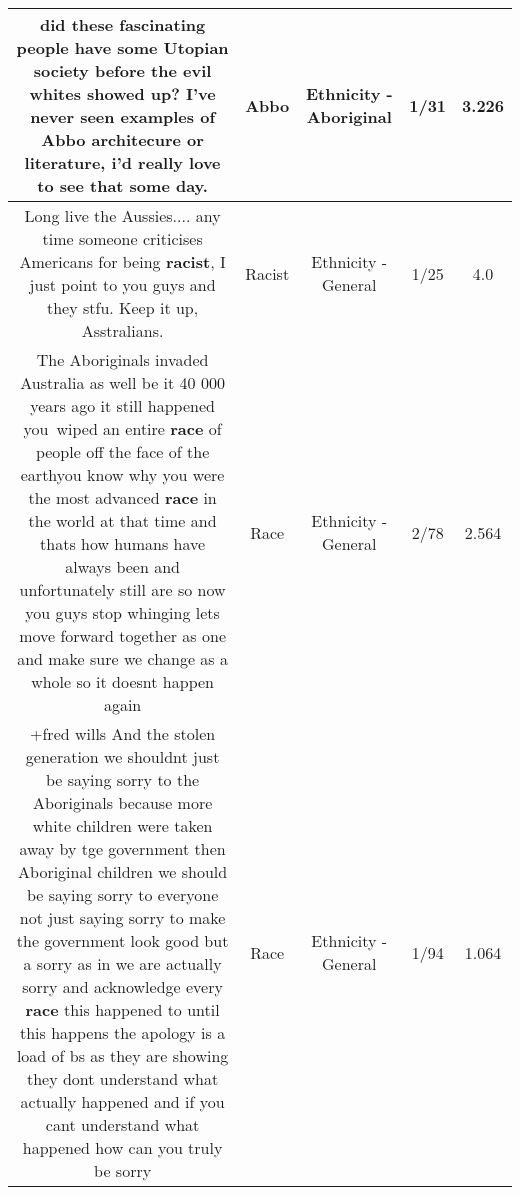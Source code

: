 \documentclass[11pt]{article}
\newlength\mylength
\begin{document}
\begin{center}
\begin{longtable}{|C{.65\mylength}|C{.30\mylength}|C{.12\mylength}|C{.12\mylength}|C{.12\mylength}|}
  \small did these fascinating people have some Utopian society before the evil whites showed up? I've never seen examples of \textbf{Abbo} architecure or literature, i'd really love to see that some day.\normalsize   & Abbo & Ethnicity - Aboriginal & 1/31 & 3.226 \\  \hline
  \small Long live the Aussies.... any time someone criticises Americans for being \textbf{racist}, I just point to you guys and they stfu. Keep it up, Asstralians.\normalsize   & Racist & Ethnicity - General & 1/25 & 4.0 \\  \hline
  \small The Aboriginals invaded Australia as well be it 40 000 years ago it still happened you wiped  an entire \textbf{race} of people off the face of the earthyou know why  you were the most advanced \textbf{race} in the world at that time and thats how humans have always been and unfortunately still are so now you guys stop whinging lets move forward together as one and make sure we change as a whole so it doesnt happen again\normalsize   & Race & Ethnicity - General & 2/78 & 2.564 \\  \hline
  \small +fred wills And the stolen generation we shouldnt just be saying sorry to the Aboriginals because more white children were taken away by tge government then Aboriginal children we should be saying sorry to everyone not just saying sorry to make the government look good but a sorry as in we are actually sorry and acknowledge every \textbf{race} this happened to until this happens the apology is a load of bs as they are showing they dont understand what actually happened and if you cant understand what happened how can you truly be sorry\normalsize   & Race & Ethnicity - General & 1/94 & 1.064 \\  \hline

\end{longtable}
\end{center}
\end{document}
